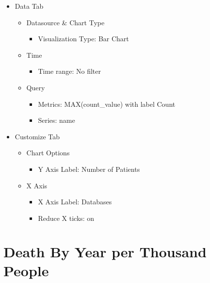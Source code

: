 \documentclass[
]{book}
\providecommand{\tightlist}{%
  \setlength{\itemsep}{0pt}\setlength{\parskip}{0pt}}
\begin{document}
\begin{itemize}
\item
  Data Tab

  \begin{itemize}
  \item
    Datasource \& Chart Type

    \begin{itemize}
    \tightlist
    \item
      Visualization Type: Bar Chart
    \end{itemize}
  \item
    Time

    \begin{itemize}
    \tightlist
    \item
      Time range: No filter
    \end{itemize}
  \item
    Query

    \begin{itemize}
    \item
      Metrics: MAX(count\_value) with label Count
    \item
      Series: name
    \end{itemize}
  \end{itemize}
\item
  Customize Tab

  \begin{itemize}
  \item
    Chart Options

    \begin{itemize}
    \tightlist
    \item
      Y Axis Label: Number of Patients
    \end{itemize}
  \item
    X Axis

    \begin{itemize}
    \item
      X Axis Label: Databases
    \item
      Reduce X ticks: on
    \end{itemize}
  \end{itemize}
\end{itemize}

\hypertarget{death-by-year-per-thousand-people}{%
\section{Death By Year per Thousand People}\label{death-by-year-per-thousand-people}}
\end{document}
